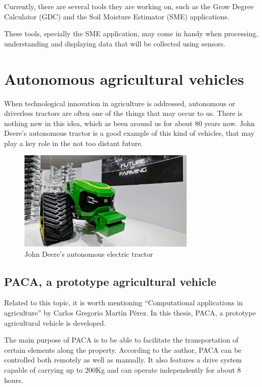 Currently, there are several tools they are working on, such as the Grow Degree Calculator (GDC) and the Soil Moisture Estimator (SME) applications.

These tools, specially the SME application, may come in handy when processing, understanding and displaying data that will be collected using sensors.


\section{Autonomous agricultural vehicles}
When technological innovation in agriculture is addressed, autonomous or driverless tractors are often one of the things that may occur to us. There is nothing new in this idea, which as been around us for about 80 years now. John Deere's autonomous tractor\cite{deere-tractor} is a good example of this kind of vehicles, that may play a key role in the not too distant future.

\begin{figure}[htp]
    \centering
    \includegraphics[width=0.75\textwidth]{fig/deere-tractor.jpg}
    \caption{John Deere’s autonomous electric tractor}
    \label{fig:deere-tractor}
\end{figure}

\subsection{PACA, a prototype agricultural vehicle}
Related to this topic, it is worth mentioning ``Computational applications in agriculture'' \cite{paca} by Carlos Gregorio Martín Pérez. In this thesis, PACA, a prototype agricultural vehicle is developed.

The main purpose of PACA is to be able to facilitate the transportation of certain elements along the property. According to the author, PACA can be controlled both remotely as well as manually. It also features a drive system capable of carrying up to 200Kg and can operate independently for about 8 hours.

